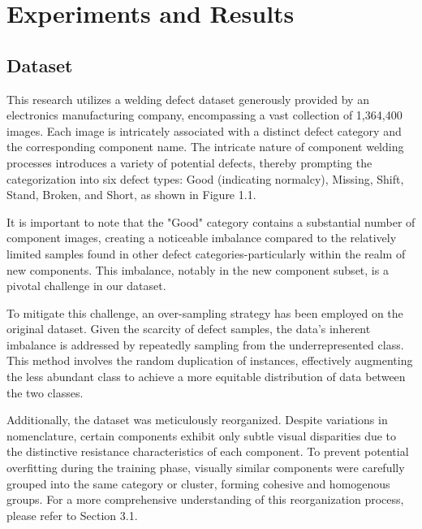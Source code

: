 \chapter{Experiments and Results}
\label{chapter:ref}


\section{Dataset}
This research utilizes a welding defect dataset generously provided by an electronics manufacturing company, encompassing a vast collection of 1,364,400 images. Each image is intricately associated with a distinct defect category and the corresponding component name. The intricate nature of component welding processes introduces a variety of potential defects, thereby prompting the categorization into six defect types: Good (indicating normalcy), Missing, Shift, Stand, Broken, and Short, as shown in Figure 1.1.

It is important to note that the "Good" category contains a substantial number of component images, creating a noticeable imbalance compared to the relatively limited samples found in other defect categories-particularly within the realm of new components. This imbalance, notably in the new component subset, is a pivotal challenge in our dataset.

To mitigate this challenge, an over-sampling strategy has been employed on the original dataset. Given the scarcity of defect samples, the data's inherent imbalance is addressed by repeatedly sampling from the underrepresented class. This method involves the random duplication of instances, effectively augmenting the less abundant class to achieve a more equitable distribution of data between the two classes.

Additionally, the dataset was meticulously reorganized. Despite variations in nomenclature, certain components exhibit only subtle visual disparities due to the distinctive resistance characteristics of each component. To  prevent potential overfitting during the training phase, visually similar components were carefully grouped into the same category or cluster, forming cohesive and homogenous groups. For a more comprehensive understanding of this reorganization process, please refer to Section 3.1.

